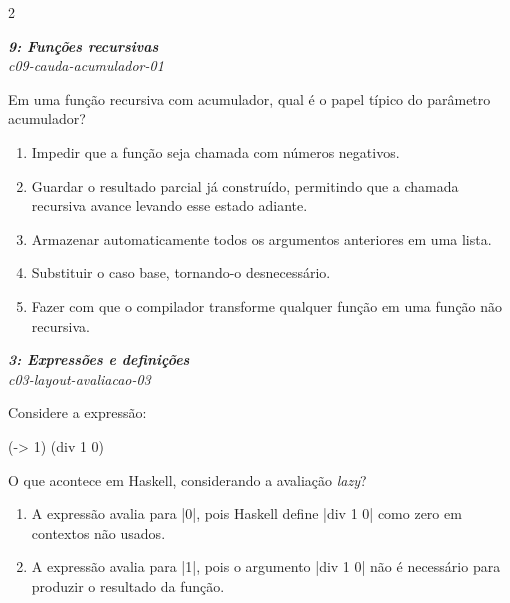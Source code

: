 \documentclass[a4paper,10pt,brazil]{article}
\begin{document}
\begin{multicols}{2}
\begin{flushright}
  \footnotesize
  \textit{\textbf{9: Funções recursivas}}\\
  \textit{c09-cauda-acumulador-01}\\

\end{flushright}
Em uma função recursiva com acumulador, qual é o papel típico do parâmetro acumulador?

\begin{enumerate}
  \item Impedir que a função seja chamada com números negativos.

  \item Guardar o resultado parcial já construído, permitindo que a chamada recursiva avance levando esse estado adiante.

  \item Armazenar automaticamente todos os argumentos anteriores em uma lista.

  \item Substituir o caso base, tornando-o desnecessário.

  \item Fazer com que o compilador transforme qualquer função em uma função não recursiva.


\end{enumerate}

\begin{flushright}
  \footnotesize
  \textit{\textbf{3: Expressões e definições}}\\
  \textit{c03-layout-avaliacao-03}\\

\end{flushright}
Considere a expressão:

\begin{haskellcode}
(\x -> 1) (div 1 0)
\end{haskellcode}

O que acontece em Haskell, considerando a avaliação \emph{lazy}?

\begin{enumerate}
  \item A expressão avalia para \haskellinline|0|, pois Haskell define \haskellinline|div 1 0| como zero em contextos não usados.

  \item A expressão avalia para \haskellinline|1|, pois o argumento \haskellinline|div 1 0| não é necessário para produzir o resultado da função.


\end{enumerate}
\end{multicols}
\end{document}
